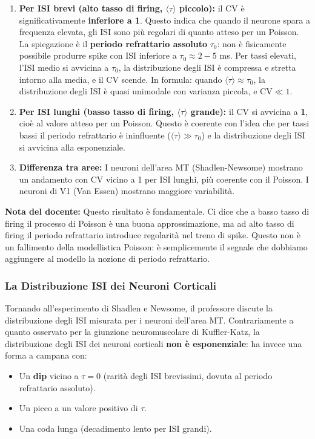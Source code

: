 \begin{enumerate}
    \item \textbf{Per ISI brevi (alto tasso di firing, $\langle \tau \rangle$ piccolo):} il CV è significativamente \textbf{inferiore a 1}. Questo indica che quando il neurone spara a frequenza elevata, gli ISI sono più regolari di quanto atteso per un Poisson. La spiegazione è il \textbf{periodo refrattario assoluto} $\tau_0$: non è fisicamente possibile produrre spike con ISI inferiore a $\tau_0 \approx 2-5$ ms. Per tassi elevati, l'ISI medio si avvicina a $\tau_0$, la distribuzione degli ISI è compressa e stretta intorno alla media, e il CV scende. In formula: quando $\langle \tau \rangle \approx \tau_0$, la distribuzione degli ISI è quasi unimodale con varianza piccola, e $\text{CV} \ll 1$.
    \item \textbf{Per ISI lunghi (basso tasso di firing, $\langle \tau \rangle$ grande):} il CV si avvicina a \textbf{1}, cioè al valore atteso per un Poisson. Questo è coerente con l'idea che per tassi bassi il periodo refrattario è ininfluente ($\langle \tau \rangle \gg \tau_0$) e la distribuzione degli ISI si avvicina alla esponenziale.
    \item \textbf{Differenza tra aree:} I neuroni dell'area MT (Shadlen-Newsome) mostrano un andamento con CV vicino a 1 per ISI lunghi, più coerente con il Poisson. I neuroni di V1 (Van Essen) mostrano maggiore variabilità.
\end{enumerate}

\begin{tcolorbox}[colback=gray!5, colframe=gray!40, arc=2mm, boxrule=0.5pt]
\textbf{Nota del docente:} Questo risultato è fondamentale. Ci dice che a basso tasso di firing il processo di Poisson è una buona approssimazione, ma ad alto tasso di firing il periodo refrattario introduce regolarità nel treno di spike. Questo non è un fallimento della modellistica Poisson: è semplicemente il segnale che dobbiamo aggiungere al modello la nozione di periodo refrattario.
\end{tcolorbox}




\subsubsection{La Distribuzione ISI dei Neuroni Corticali}

Tornando all'esperimento di Shadlen e Newsome, il professore discute la distribuzione degli ISI misurata per i neuroni dell'area MT. Contrariamente a quanto osservato per la giunzione neuromuscolare di Kuffler-Katz, la distribuzione degli ISI dei neuroni corticali \textbf{non è esponenziale}: ha invece una forma a campana con:
\begin{itemize}
    \item Un \textbf{dip} vicino a $\tau = 0$ (rarità degli ISI brevissimi, dovuta al periodo refrattario assoluto).
    \item Un picco a un valore positivo di $\tau$.
    \item Una coda lunga (decadimento lento per ISI grandi).
\end{itemize}

